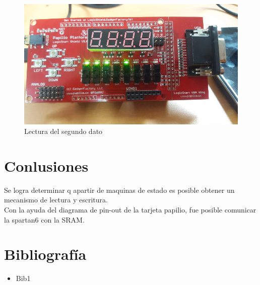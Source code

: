 \documentclass[10pt]{article}
\begin{document}
\begin{figure}[hbtp]
\centering
\includegraphics[width=1\textwidth]{lecturab.jpg}
\caption{Lectura del segundo dato}
\label{lectura_2}
\end{figure}
\pagebreak
\section{Conlusiones}
Se logra determinar q apartir de maquinas de estado es posible obtener un mecanismo de lectura y escritura.\\
Con la ayuda del diagrama de pin-out de la tarjeta papilio, fue posible comunicar la spartan6 con la SRAM.\\
\section{Bibliografía}
\begin{itemize}
\item Bib1
\end{itemize}
\end{document}
